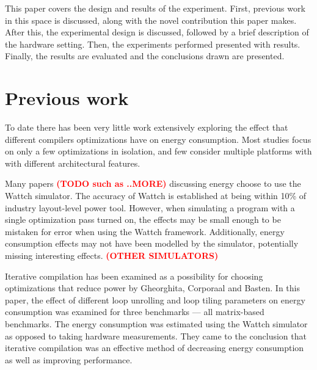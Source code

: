 \documentclass[twocolumn]{article}
\newcommand{\todo}[1]{\textbf{\textcolor{red}{#1}}}
\begin{document}

This paper covers the design and results of the experiment. First, previous work in this space is discussed, along with the novel contribution this paper makes. After this, the experimental design is discussed, followed by a brief description of the hardware setting. Then, the experiments performed presented with results. Finally, the results are evaluated and the conclusions drawn are presented.

\section*{Previous work}

To date there has been very little work extensively exploring the effect that different compilers optimizations have on energy consumption. Most studies focus on only a few optimizations in isolation, and few consider multiple platforms with with different architectural features.

Many papers \todo{(TODO such as ..MORE)} discussing energy choose to use the Wattch simulator\cite{Wattch}. The accuracy of Wattch is established at being within 10\% of industry layout-level power tool. However, when simulating a program with a single optimization pass turned on, the effects may be small enough to be mistaken for error when using the Wattch framework. Additionally, energy consumption effects may not have been modelled by the simulator, potentially missing interesting effects. \todo{(OTHER SIMULATORS)}

Iterative compilation has been examined as a possibility for choosing optimizations that reduce power by Gheorghita, Corporaal and Basten\cite{IterativeCompilationForEnergy}. In this paper, the effect of different loop unrolling and loop tiling parameters on energy consumption was examined for three benchmarks --- all matrix-based benchmarks. The energy consumption was estimated using the Wattch simulator as opposed to taking hardware measurements. They came to the conclusion that iterative compilation was an effective method of decreasing energy consumption as well as improving performance.
\end{document}
